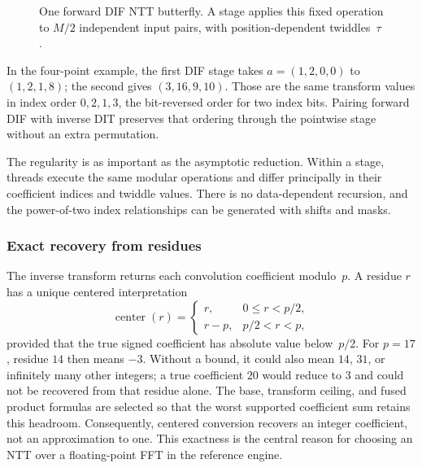 \begin{figure}[!htbp]
\centering
{}
\caption[Radix-2 NTT butterfly]{One forward DIF NTT butterfly.  A stage applies this fixed
  operation to $M/2$ independent input pairs, with position-dependent twiddles~$\tau$.}
\label{fig:ntt-butterfly}
\end{figure}

In the four-point example, the first DIF stage takes $a=(1,2,0,0)$
to $(1,2,1,8)$; the second gives $(3,16,9,10)$.  Those are the same
transform values in index order $0,2,1,3$, the bit-reversed order for two
index bits.  Pairing forward DIF with inverse DIT preserves that ordering
through the pointwise stage without an extra permutation.

The regularity is as important as the asymptotic reduction.  Within a stage,
threads execute the same modular operations and differ principally in their
coefficient indices and twiddle values.  There is no data-dependent recursion,
and the power-of-two index relationships can be generated with shifts and
masks.

\subsubsection{Exact recovery from residues}

The inverse transform returns each convolution coefficient modulo~$p$.  A
residue $r$ has a unique centered interpretation
\begin{equation}
  \operatorname{center}(r)=
  \begin{cases}
    r, & 0\le r < p/2, \\
    r-p, & p/2 < r < p,
  \end{cases}
  \label{eq:ntt-centered-residue}
\end{equation}
provided that the true signed coefficient has absolute value below~$p/2$.
For $p=17$, residue $14$ then means $-3$.  Without a bound, it could also
mean $14$, $31$, or infinitely many other integers; a true coefficient $20$
would reduce to $3$ and could not be recovered from that residue alone.
The base, transform ceiling, and fused product formulas are selected so that
the worst supported coefficient sum retains this headroom.  Consequently,
centered conversion recovers an integer coefficient, not an approximation to
one.  This exactness is the central reason for choosing an NTT over a
floating-point FFT in the reference engine.

